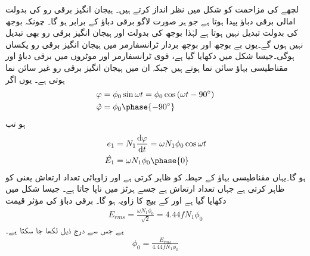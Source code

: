 لچھے کی مزاحمت کو شکل  میں نظر انداز کرتے ہیں۔ ہیجان انگیز برقی رو  کی بدولت امالی برقی دباؤ  پیدا ہوتا ہے جو ہر صورت لاگو برقی دباؤ  کے برابر ہو گا۔ چونکہ بوجھ کی بدولت   تبدیل نہیں ہوتا ہے لہٰذا بوجھ کی بدولت  اور ہیجان انگیز برقی رو  بھی تبدیل نہیں ہوں گے۔یوں بے بوجھ اور بوجھ بردار ٹرانسفارمر میں ہیجان انگیز برقی رو   یکساں   ہوگی۔جیسا شکل  میں دکھایا گیا ہے، قوی ٹرانسفارمر اور موٹروں میں برقی دباؤ اور مقناطیسی بہاؤ سائن نما ہوتے ہیں جبکہ ان میں ہیجان انگیز برقی رو  غیر سائن نما ہوتی  ہے۔ یوں اگر
\begin{gather}
\begin{aligned}
\varphi&=\phi_0 \sin \omega t=\phi_0 \cos \left(\omega t -90^{\circ} \right)\\
\hat{\varphi}&=\phi_0 \phase{-90^{\circ}}
\end{aligned}
\end{gather}
ہو تب
\begin{gather}
\begin{aligned}\label{مساوات_ٹڑانسفارمر_دباو_سمتیہ}
e_1&=N_1 \frac{\dif \varphi}{\dif t}=\omega N_1 \phi_0 \cos \omega t\\
\hat{E_1}&=\omega N_1 \phi_0 \phase{0}
\end{aligned}
\end{gather}
ہو گا۔یہاں  مقناطیسی بہاؤ کے حیطہ کو ظاہر کرتی ہے اور  زاویائی تعداد ارتعاش یعنی  کو ظاہر کرتی ہے  جہاں  تعداد ارتعاش ہے جسے ہرٹز  میں ناپا جاتا ہے۔ جیسا شکل  میں دکھایا گیا ہے  اور  کے بیچ  کا زاویہ ہو گا۔ برقی دباؤ  کی مؤثر قیمت   
\begin{align}
E_{rms}=\frac{\omega N_1 \phi_0}{\sqrt{2}}=4.44 f N_1 \phi_0
\end{align}
ہے جس سے درج ذیل لکھا جا سکتا ہے۔
\begin{align}\label{مساوات_ٹرانسفارمر_درکار_ہیجان_بہاو}
\phi_0=\frac{E_{rms}}{4.44 f N_1 \phi_0}
\end{align}

